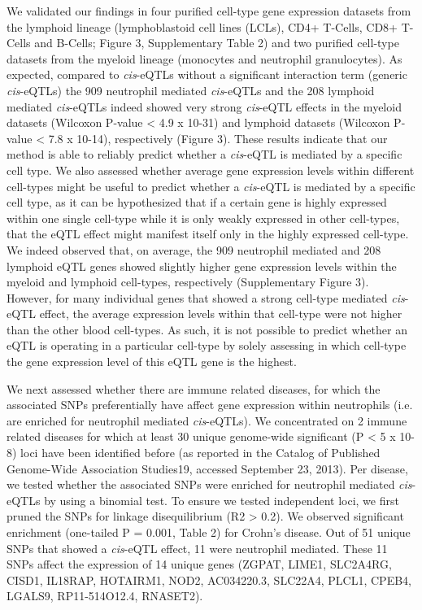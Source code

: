   We validated our findings in four purified cell-type gene expression datasets from the lymphoid 
  lineage (lymphoblastoid cell lines (LCLs), CD4+ T-Cells, CD8+ T-Cells and B-Cells; Figure 3, 
  Supplementary Table 2) and two purified cell-type datasets from the myeloid lineage (monocytes and 
  neutrophil granulocytes). As expected, compared to \emph{cis}-eQTLs without a significant interaction term 
  (generic \emph{cis}-eQTLs) the 909 neutrophil mediated \emph{cis}-eQTLs and the 208 lymphoid mediated \emph{cis}-eQTLs 
  indeed showed very strong \emph{cis}-eQTL effects in the myeloid datasets (Wilcoxon P-value < 4.9 x 10-31) 
  and lymphoid datasets (Wilcoxon P-value < 7.8 x 10-14), respectively (Figure 3). These results 
  indicate that our method is able to reliably predict whether a \emph{cis}-eQTL is mediated by a specific 
  cell type. We also assessed whether average gene expression levels within different cell-types might 
  be useful to predict whether a \emph{cis}-eQTL is mediated by a specific cell type, as it can be hypothesized 
  that if a certain gene is highly expressed within one single cell-type while it is only weakly 
  expressed in other cell-types, that the eQTL effect might manifest itself only in the highly expressed 
  cell-type. We indeed observed that, on average, the 909 neutrophil mediated and 208 lymphoid eQTL 
  genes showed slightly higher gene expression levels within the myeloid and lymphoid cell-types, 
  respectively (Supplementary Figure 3). However, for many individual genes that showed a strong 
  cell-type mediated \emph{cis}-eQTL effect, the average expression levels within that cell-type were not 
  higher than the other blood cell-types. As such, it is not possible to predict whether an eQTL is 
  operating in a particular cell-type by solely assessing in which cell-type the gene expression level 
  of this eQTL gene is the highest. 

  We next assessed whether there are immune related diseases, for which the associated SNPs 
  preferentially have affect gene expression within neutrophils (i.e. are enriched for neutrophil 
  mediated \emph{cis}-eQTLs).  We concentrated on 2 immune related diseases for which at least 30 unique 
  genome-wide significant (P < 5 x 10-8) loci have been identified before (as reported in the Catalog 
  of Published Genome-Wide Association Studies19, accessed September 23, 2013). Per disease, we tested 
  whether the associated SNPs were enriched for neutrophil mediated \emph{cis}-eQTLs by using a binomial test. 
  To ensure we tested independent loci, we first pruned the SNPs for linkage disequilibrium (R2 > 0.2). 
  We observed significant enrichment (one-tailed P = 0.001, Table 2) for Crohn's disease. Out of 51 
  unique SNPs that showed a \emph{cis}-eQTL effect, 11 were neutrophil mediated. These 11 SNPs affect the 
  expression of 14 unique genes (ZGPAT, LIME1, SLC2A4RG, CISD1, IL18RAP, HOTAIRM1, NOD2, AC034220.3, 
  SLC22A4, PLCL1, CPEB4, LGALS9, RP11-514O12.4, RNASET2).

